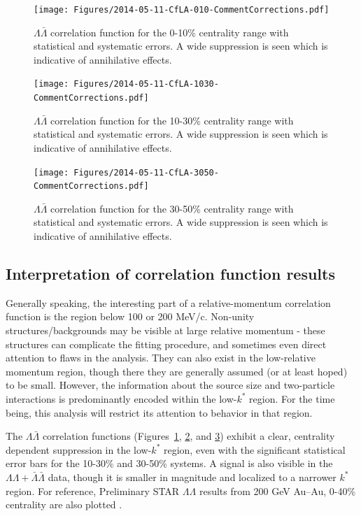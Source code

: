 \begin{figure}[hbtp]
\texttt{[image: Figures/2014-05-11-CfLA-010-CommentCorrections.pdf]}
\caption[$\Lambda\bar{\Lambda}$ correlation function for the 0-10\% centrality range]{$\Lambda\bar{\Lambda}$ correlation function for the 0-10\% centrality range with statistical and systematic errors.  
A wide suppression is seen which is indicative of annihilative effects.}
\label{fig:CFLamALam010}
\end{figure}
\begin{figure}[hbtp]
\texttt{[image: Figures/2014-05-11-CfLA-1030-CommentCorrections.pdf]}
\caption[$\Lambda\bar{\Lambda}$ correlation function for the 10-30\% centrality range]{$\Lambda\bar{\Lambda}$ correlation function for the 10-30\% centrality range with statistical and systematic errors.  
A wide suppression is seen which is indicative of annihilative effects.}
\label{fig:CFLamALam1030}
\end{figure}
\begin{figure}[hbtp]
\texttt{[image: Figures/2014-05-11-CfLA-3050-CommentCorrections.pdf]}
\caption[$\Lambda\bar{\Lambda}$ correlation function for the 30-50\% centrality range]{$\Lambda\bar{\Lambda}$ correlation function for the 30-50\% centrality range with statistical and systematic errors.  
A wide suppression is seen which is indicative of annihilative effects.}
\label{fig:CFLamALam3050}
\end{figure}

\subsection{Interpretation of correlation function results}
\label{sec:CFInterpretation}


Generally speaking, the interesting part of a relative-momentum correlation function is the region below 100 or 200 MeV/c.  
Non-unity structures/backgrounds may be visible at large relative momentum - these structures can complicate the fitting procedure, and sometimes even direct attention to flaws in the analysis.  
They can also exist in the low-relative momentum region, though there they are generally assumed (or at least hoped) to be small.  
However, the information about the source size and two-particle interactions is predominantly encoded within the low-$k^*$ region.  
For the time being, this analysis will restrict its attention to behavior in that region.

The $\Lambda\bar{\Lambda}$ correlation functions (Figures\ \ref{fig:CFLamALam010}, \ref{fig:CFLamALam1030}, and \ref{fig:CFLamALam3050}) exhibit a clear, centrality dependent suppression in the low-$k^*$ region, even with the significant statistical error bars for the 10-30\% and 30-50\% systems.  
A signal is also visible in the $\Lambda\Lambda + \bar{\Lambda}\bar{\Lambda}$ data, though it is smaller in magnitude and localized to a narrower $k^*$ region. 
For reference, Preliminary STAR $\Lambda\Lambda$ results from 200 GeV Au--Au, 0-40\% centrality are also plotted \cite{Shah:2012ps}.

